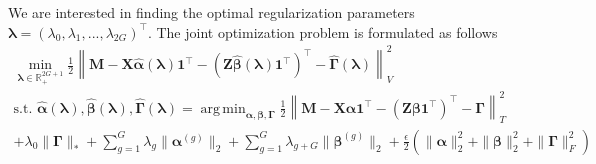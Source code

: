 \documentclass[12pt]{article}
\DeclareMathOperator*{\argmin}{arg\,min}
\begin{document}
We are interested in finding the optimal regularization parameters $\boldsymbol{\lambda} = (\lambda_0, \lambda_1, ...,  \lambda_{2G})^\top$. The joint optimization problem is formulated as follows
\begin{equation}
	\begin{array}{c}
		\min_{\boldsymbol{\lambda} \in \mathbb{R}^{2G+1}_{+}} \frac{1}{2}
		\left \| 
		\boldsymbol{M} 
		- \boldsymbol{X} \hat{\boldsymbol{\alpha}}(\boldsymbol{\lambda})  \boldsymbol{1}^\top 
		- (\boldsymbol{Z} \hat{\boldsymbol{\beta}}(\boldsymbol{\lambda})  \boldsymbol{1}^\top )^\top
		- \hat{\boldsymbol{\Gamma}}(\boldsymbol{\lambda})
		\right \|^2_V \\
		\text{s.t. }
		\hat{\boldsymbol{\alpha}}(\boldsymbol{\lambda}),
		\hat{\boldsymbol{\beta}}(\boldsymbol{\lambda}),
		\hat{\boldsymbol{\Gamma}}(\boldsymbol{\lambda})
		 =
		\argmin_{\boldsymbol{\alpha}, \boldsymbol{\beta}, \boldsymbol{\Gamma}} 
		\frac{1}{2} 
		\left \| 
		\boldsymbol{M} 
		- \boldsymbol{X} \boldsymbol{\alpha} \boldsymbol{1}^\top 
		- (\boldsymbol{Z} \boldsymbol{\beta} \boldsymbol{1}^\top )^\top
		- \boldsymbol{\Gamma}
		\right \|^2_T \\
		+ \lambda_0 \| \boldsymbol\Gamma \|_*
		+ \sum_{g=1}^G \lambda_g \| \boldsymbol\alpha^{(g)} \|_2
		+ \sum_{g=1}^G  \lambda_{g+G} \| \boldsymbol\beta^{(g)} \|_2
		+ \frac{\epsilon}{2}  \left (
		\| \boldsymbol\alpha \|_2^2 + \| \boldsymbol\beta \|_2^2
		+ \| \boldsymbol{\Gamma}\|^2_F
		\right )
	\end{array}
	\label{eq:matrix_comp_groups}
\end{equation}
\end{document}
